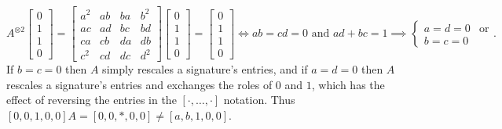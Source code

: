 \documentclass{article}
\begin{document}
\[
    A^{\otimes 2}
    \begin{bmatrix} 0 \\ 1 \\ 1 \\ 0 \end{bmatrix} =
    \begin{bmatrix} 
        a^2 & ab & ba & b^2 \\
        ac & ad & bc & bd \\
        ca & cb & da & db \\
        c^2 & cd & dc & d^2
    \end{bmatrix}
    \begin{bmatrix} 0 \\ 1 \\ 1 \\ 0 \end{bmatrix}
    = \begin{bmatrix} 0 \\ 1 \\ 1 \\ 0 \end{bmatrix}
    \iff ab = cd = 0 \text{ and } ad + bc = 1
    \implies \begin{cases} a = d = 0 & \text{or} \\ b = c = 0\end{cases}.
\]
If $b=c=0$ then $A$ simply rescales a signature's entries, and if $a=d=0$ then
$A$ rescales a signature's entries and exchanges the roles of $0$ and $1$, which has the effect of
reversing the entries in the $[\cdot,\ldots,\cdot]$ notation. Thus $[0,0,1,0,0]A = [0,0,*,0,0]
\neq [a,b,1,0,0]$.
\end{document}
